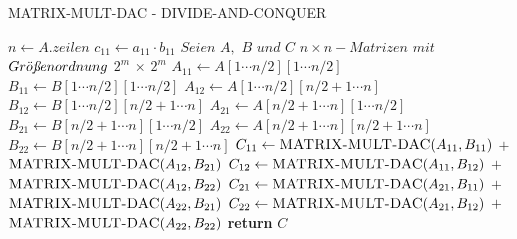 \begin{algorithm}[hbt!]
\begin{algorithmic}[1]
\caption{MATRIX-MULT-DAC - DIVIDE-AND-CONQUER}
    \State $n\gets A.zeilen$
        \State $c_{11}\gets a_{11}\cdot b_{11}$
    \Else  
        \State $Seien$ $A,$ $B$ $und$ $C$ $n\times n-Matrizen$ $mit$ $Gr\Ddot{o}{\textit{\text{\ss}}}enordnung$ $2^m$ $\times$ $2^m$
        \State $A_{11}\gets A[1\dotsb n/2][1\dotsb n/2]$
        \State $B_{11}\gets B[1\dotsb n/2][1\dotsb n/2]$
        \State $A_{12}\gets A[1\dotsb n/2][n/2 + 1\dotsb n]$
        \State $B_{12}\gets B[1\dotsb n/2][n/2 + 1\dotsb n]$
        \State $A_{21}\gets A[n/2 + 1\dotsb n][1\dotsb n/2]$
        \State $B_{21}\gets B[n/2 + 1\dotsb n][1\dotsb n/2]$
        \State $A_{22}\gets A[n/2 + 1\dotsb n][n/2 + 1\dotsb n]$
        \State $B_{22}\gets B[n/2 + 1\dotsb n][n/2 + 1\dotsb n]$
        \State $C_{11}\gets \Call{MATRIX-MULT-DAC}{A_{11}, B_{11}}$ \newline
        \hspace*{4.75em} $+$ $\Call{MATRIX-MULT-DAC}{A_{12}, B_{21}}$
        \State $C_{12}\gets \Call{MATRIX-MULT-DAC}{A_{11}, B_{12}}$ \newline
        \hspace*{4.75em} $+$ $\Call{MATRIX-MULT-DAC}{A_{12}, B_{22}}$ 
        \State $C_{21}\gets \Call{MATRIX-MULT-DAC}{A_{21}, B_{11}}$ \newline
        \hspace*{4.75em} $+$ $\Call{MATRIX-MULT-DAC}{A_{22}, B_{21}}$
        \State $C_{22}\gets \Call{MATRIX-MULT-DAC}{A_{21}, B_{12}}$ \newline
        \hspace*{4.75em} $+$ $\Call{MATRIX-MULT-DAC}{A_{22}, B_{22}}$
    \EndIf
    \State \textbf{return} $C$ 
\EndProcedure
\end{algorithmic}\label{alg:algorithm2}
\end{algorithm}


